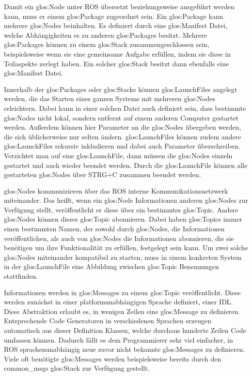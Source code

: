 Damit ein \gls{glos:Node} unter \gls{ROS} übersetzt beziehungsweise ausgeführt werden kann, muss er einem \gls{glos:Package} zugeordnet sein. Ein \gls{glos:Package} kann mehrere \glspl{glos:Node} beinhalten. Es definiert durch eine \gls{glos:Manifest} Datei, welche Abhängigkeiten es zu anderen \glspl{glos:Package} besitzt. Mehrere \glspl{glos:Package} können zu einem \gls{glos:Stack} zusammengeschlossen sein, beispielsweise wenn sie eine gemeinsame Aufgabe erfüllen, indem sie diese in Teilaspekte zerlegt haben. Ein solcher \gls{glos:Stack} besitzt dann ebenfalls eine \gls{glos:Manifest} Datei.

Innerhalb der \glspl{glos:Package} oder \glspl{glos:Stack} können \glspl{glos:LaunchFile} angelegt werden, die das Starten eines ganzen Systems mit mehreren \glspl{glos:Node} erleichtern. Dabei kann in einer solchen Datei auch definiert sein, dass bestimmte \glspl{glos:Node} nicht lokal, sondern entfernt auf einem anderen Computer gestartet werden. Außerdem können hier Parameter an die \glspl{glos:Node} übergeben werden, die sich üblicherweise nur selten ändern. \glspl{glos:LaunchFile} können zudem andere \glspl{glos:LaunchFile} rekursiv inkludieren und dabei auch Parameter überschreiben. Verzichtet man auf eine \gls{glos:LaunchFile}, dann müssen die \glspl{glos:Node} einzeln gestartet und auch wieder beendet werden. Durch die \gls{glos:LaunchFile} können alle gestarteten \glspl{glos:Node} über STRG+C zusammen beendet werden.

\glspl{glos:Node} kommunizieren über das \gls{ROS} interne Kommunikationsnetzwerk miteinander. Das heißt, wenn ein \gls{glos:Node} Informationen anderen \glspl{glos:Node} zur Verfügung stellt, veröffentlicht er diese über ein bestimmtes \gls{glos:Topic}. Andere \glspl{glos:Node} können dieses \gls{glos:Topic} abonnieren. Dabei haben \glspl{glos:Topic} immer einen bestimmten Namen, der sowohl durch \glspl{glos:Node}, die Informationen veröffentlichen, als auch von \glspl{glos:Node} die Informationen abonnieren, die sie benötigen um ihre Funktionalität zu erfüllen, festgelegt sein kann. Um zwei solche \glspl{glos:Node} miteinander kompatibel zu starten, muss in einem konkreten System in der \gls{glos:LaunchFile} eine Abbildung zwischen \gls{glos:Topic} Benennungen stattfinden.

Informationen werden in \glspl{glos:Message} zu einem \gls{glos:Topic} veröffentlicht. Diese werden zunächst in einer platformunabhängigen Sprache definiert, einer \gls{IDL}. Diese Abstraktion erlaubt es, in wenigen Zeilen eine \gls{glos:Message} zu definieren. Entsprechende Code Generatoren in verschiedenen Sprachen erzeugen automatisch aus dieser Definition Klassen, welche durchaus hunderte Zeilen Code umfassen können. Dadurch fällt es dem Programmierer sehr viel einfacher, in \gls{ROS} sprachenunabhängig neue zuvor nicht bekannte \glspl{glos:Message} zu definieren. Viele oft benötigte \glspl{glos:Message} werden beispielsweise bereits durch den common\_msgs \gls{glos:Stack} zur Verfügung gestellt.

